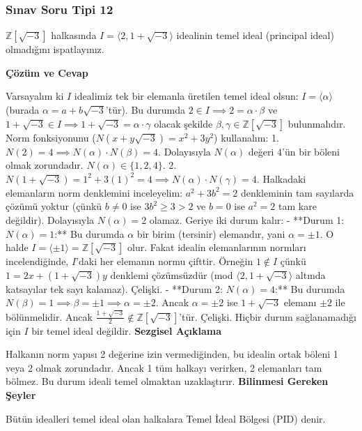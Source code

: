 \documentclass[11pt, a4paper]{article}
\newenvironment{cozum}{
    \vspace{0.5cm}
    \noindent\textcolor{green!60!black}{\faCheckCircle\enspace \textbf{\Large Çözüm ve Cevap}}\par\vspace{0.2cm}
}{}
\newenvironment{sezgisel}{
    \vspace{0.5cm}
    \noindent\textcolor{orange!80!black}{\faLightbulb\enspace \textbf{\Large Sezgisel Açıklama}}\par\vspace{0.2cm}
    \itshape
}{}
\newenvironment{bilgi}{
    \vspace{0.5cm}
    \noindent\textcolor{red!70!black}{\faExclamationTriangle\enspace \textbf{\Large Bilinmesi Gereken Şeyler}}\par\vspace{0.2cm}
}{}
\begin{document}
\subsubsection{Sınav Soru Tipi 12}
\begin{sinavbox}
$\mathbb{Z}[\sqrt{-3}]$ halkasında $I = \langle 2, 1+\sqrt{-3} \rangle$ idealinin temel ideal (principal ideal) olmadığını ispatlayınız.
\end{sinavbox}
\begin{cozum}
Varsayalım ki $I$ idealimiz tek bir elemanla üretilen temel ideal olsun: $I = \langle \alpha \rangle$ (burada $\alpha = a + b\sqrt{-3}$'tür).
Bu durumda $2 \in I \implies 2 = \alpha \cdot \beta$ ve $1+\sqrt{-3} \in I \implies 1+\sqrt{-3} = \alpha \cdot \gamma$ olacak şekilde $\beta, \gamma \in \mathbb{Z}[\sqrt{-3}]$ bulunmalıdır.
Norm fonksiyonunu ($N(x+y\sqrt{-3}) = x^2+3y^2$) kullanalım:
1. $N(2) = 4 \implies N(\alpha) \cdot N(\beta) = 4$. Dolayısıyla $N(\alpha)$ değeri $4$'ün bir böleni olmak zorundadır. $N(\alpha) \in \{1, 2, 4\}$.
2. $N(1+\sqrt{-3}) = 1^2+3(1)^2 = 4 \implies N(\alpha) \cdot N(\gamma) = 4$.
Halkadaki elemanların norm denklemini inceleyelim: $a^2+3b^2 = 2$ denkleminin tam sayılarda çözümü yoktur (çünkü $b \neq 0$ ise $3b^2 \ge 3 > 2$ ve $b=0$ ise $a^2=2$ tam kare değildir). Dolayısıyla $N(\alpha) = 2$ olamaz.
Geriye iki durum kalır:
- **Durum 1: $N(\alpha) = 1$:** Bu durumda $\alpha$ bir birim (tersinir) elemandır, yani $\alpha = \pm 1$. O halde $I = \langle \pm 1 \rangle = \mathbb{Z}[\sqrt{-3}]$ olur. Fakat idealin elemanlarının normları incelendiğinde, $I$'daki her elemanın normu çifttir. Örneğin $1 \notin I$ çünkü $1 = 2x + (1+\sqrt{-3})y$ denklemi çözümsüzdür (mod $\langle 2, 1+\sqrt{-3} \rangle$ altında katsayılar tek sayı kalamaz). Çelişki.
- **Durum 2: $N(\alpha) = 4$:** Bu durumda $N(\beta) = 1 \implies \beta = \pm 1 \implies \alpha = \pm 2$. Ancak $\alpha = \pm 2$ ise $1+\sqrt{-3}$ elemanı $\pm 2$ ile bölünmelidir. Ancak $\frac{1+\sqrt{-3}}{2} \notin \mathbb{Z}[\sqrt{-3}]$'tür. Çelişki.
Hiçbir durum sağlanamadığı için $I$ bir temel ideal değildir.
\end{cozum}
\begin{sezgisel}
Halkanın norm yapısı 2 değerine izin vermediğinden, bu idealin ortak böleni 1 veya 2 olmak zorundadır. Ancak 1 tüm halkayı verirken, 2 elemanları tam bölmez. Bu durum ideali temel olmaktan uzaklaştırır.
\end{sezgisel}
\begin{bilgi}
Bütün idealleri temel ideal olan halkalara Temel İdeal Bölgesi (PID) denir.
\end{bilgi}
\end{document}
